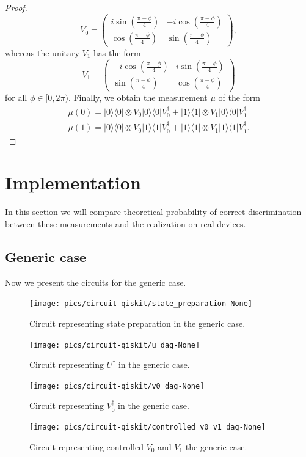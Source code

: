 \documentclass[preprint,12pt, a4paper]{elsarticle}
\newcommand{\ket}[1]{\ensuremath{|#1\rangle}}
\newcommand{\bra}[1]{\ensuremath{\langle#1|}}
\newcommand{\ketbra}[2]{\ensuremath{\ket{#1}\bra{#2}}}
\newcommand{\proj}[1]{\ensuremath{\ketbra{#1}{#1}}}
\newcommand{\1}{{\rm 1\hspace{-0.9mm}l}}
\begin{document}
\begin{proof}
\begin{equation}
V_0 = \left(
\begin{array}{cc}i \sin\left( \frac{\pi - \phi}{4} \right)&-i 
\cos\left( \frac{\pi - \phi}{4} \right)\\ \cos\left( \frac{\pi - 
\phi}{4}\right)& \sin\left( \frac{\pi - \phi}{4} \right)
\end{array}
\right),
\end{equation}
whereas the unitary  $V_1$  has the form
\begin{equation}
V_1 = \left(\begin{array}{cc}-i \cos\left(\frac{\pi - \phi}{4}\right) &i 
\sin\left( \frac{\pi - \phi}{4}\right)\\\sin\left( \frac{\pi - \phi}{4} 
\right) &  \cos\left( \frac{\pi - \phi}{4} \right) \end{array}\right)
\end{equation}
for all $\phi \in [0,2\pi)$. 
Finally, we obtain the measurement $\mu$ of the form
\begin{equation}
\begin{split}
\mu(0) = \proj{0} \otimes V_0 \proj{0} V_0^\dagger +  \proj{1} \otimes V_1 
\proj{0} V_1^\dagger  \\ 
\mu(1) = \proj{0} \otimes V_0 \proj{1} V_0^\dagger +  \proj{1} \otimes V_1 
\proj{1} V_1^\dagger.  
\end{split}
\end{equation} 



\end{proof}


\section{Implementation}
In this section we will compare theoretical probability of correct 
discrimination between these measurements and the realization on real devices.

\subsection{Generic case}
Now we present the circuits for the generic case.
\begin{figure}[h!]
\centering
\texttt{[image: pics/circuit-qiskit/state\_preparation-None]}
\caption{Circuit representing state preparation in the  generic case.}
\end{figure}
\begin{figure}[h!]
\centering
\texttt{[image: pics/circuit-qiskit/u\_dag-None]}
\caption{Circuit representing $U^\dagger$ in the generic case.}
\end{figure}
\begin{figure}[h!]
\centering
\texttt{[image: pics/circuit-qiskit/v0\_dag-None]}
\caption{Circuit representing $V_0^\dagger$ in the generic case.}
\end{figure}
\begin{figure}[h!]
\centering
\texttt{[image: pics/circuit-qiskit/controlled\_v0\_v1\_dag-None]}
\caption{Circuit representing controlled $V_0$ and $V_1$ the generic case.}
\end{figure}
\end{document}
